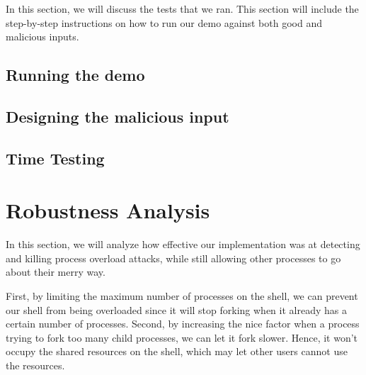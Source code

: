 \documentclass{article}
\begin{document}
In this section, we will discuss the tests that we ran. This section will
include the step-by-step instructions on how to run our demo against both good
and malicious inputs.

\subsection{Running the demo}
\subsection{Designing the malicious input}
\subsection{Time Testing}




\section{Robustness Analysis}

In this section, we will analyze how effective our implementation was at
detecting and killing process overload attacks, while still allowing other processes to go about their merry way.


First, by limiting the maximum number of processes on the shell, we can prevent our shell from being overloaded since it will stop forking when it already has a certain number of processes.
Second, by increasing the nice factor when a process trying to fork too many child processes, we can let it fork slower.  Hence, it won’t occupy the shared resources on the shell, which may let other users cannot use the resources. \\ 
\end{document}
